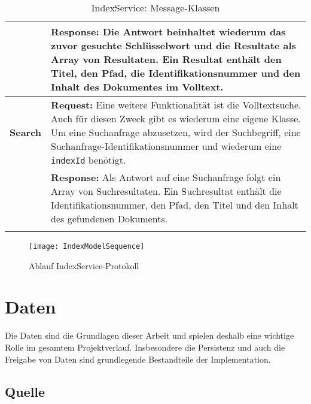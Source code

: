 \begin{longtable}{|p{4cm}| p{8cm}|}
     & \textbf{Response:} \newline Die Antwort beinhaltet wiederum das zuvor gesuchte Schlüsselwort und die Resultate als Array von Resultaten. Ein Resultat enthält den Titel, den Pfad, die Identifikationsnummer und den Inhalt des Dokumentes im Volltext.\\\hline
    \textbf{Search} & \textbf{Request:} \newline Eine weitere Funktionalität ist die Volltextsuche. Auch für diesen Zweck gibt es wiederum eine eigene Klasse. Um eine Suchanfrage abzusetzen, wird der Suchbegriff, eine Suchanfrage-Identifikationsnummer und wiederum eine \texttt{indexId} benötigt.\newline\\
     & \textbf{Response:} \newline Als Antwort auf eine Suchanfrage folgt ein Array von Suchresultaten. Ein Suchresultat enthält die Identifikationsnummer, den Pfad, den Titel und den Inhalt des gefundenen Dokuments.\\\hline
        \caption{IndexService: Message-Klassen}
    \label{indexservice-bodies}
\end{longtable}

    \begin{figure}[H]
    \centering
    \texttt{[image: IndexModelSequence]}
    \caption{Ablauf IndexService-Protokoll}
    \label{fig:seqindexprotocol}
    \end{figure}


\section{Daten}


Die Daten sind die Grundlagen dieser Arbeit und spielen deshalb eine wichtige Rolle im gesamtem Projektverlauf. Insbesondere die Persistenz und auch die Freigabe von Daten sind grundlegende Bestandteile der Implementation.


    
\subsection{Quelle}



